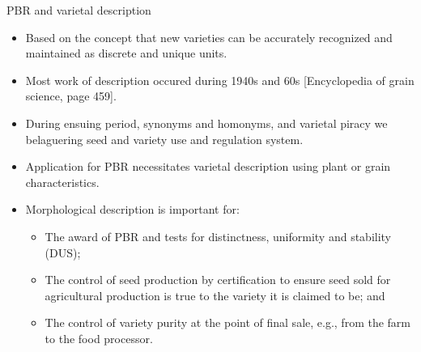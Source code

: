 \documentclass[ignorenonframetext,aspectratio=169]{beamer}
\providecommand{\tightlist}{%
  \setlength{\itemsep}{0pt}\setlength{\parskip}{0pt}}
\begin{document}
\begin{frame}{PBR and varietal description}
\protect\hypertarget{pbr-and-varietal-description}{}

\begin{itemize}
\tightlist
\item
  Based on the concept that new varieties can be accurately recognized
  and maintained as discrete and unique units.
\item
  Most work of description occured during 1940s and 60s {[}Encyclopedia
  of grain science, page 459{]}.
\item
  During ensuing period, synonyms and homonyms, and varietal piracy we
  belaguering seed and variety use and regulation system.
\item
  Application for PBR necessitates varietal description using plant or
  grain characteristics.
\end{itemize}

\end{frame}

\begin{frame}{}
\protect\hypertarget{section}{}

\begin{itemize}
\tightlist
\item
  Morphological description is important for:

  \begin{itemize}
  \tightlist
  \item
    The award of PBR and tests for distinctness, uniformity and
    stability (DUS);
  \item
    The control of seed production by certification to ensure seed sold
    for agricultural production is true to the variety it is claimed to
    be; and
  \item
    The control of variety purity at the point of final sale, e.g., from
    the farm to the food processor.
  \end{itemize}
\end{itemize}

\end{frame}
\end{document}

